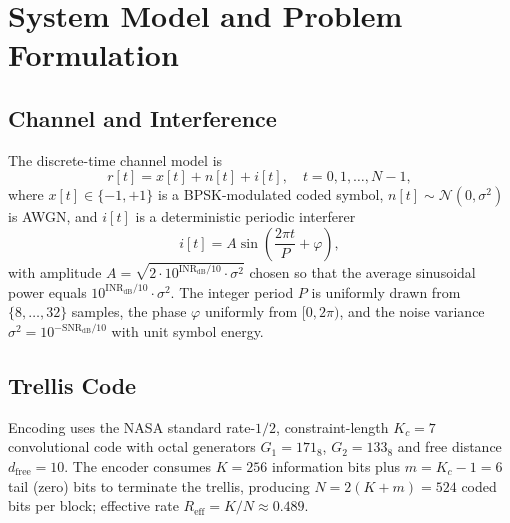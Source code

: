 \documentclass[conference]{IEEEtran}
\newcommand{\dfree}{d_{\mathrm{free}}}
\begin{document}
\section{System Model and Problem Formulation}

\subsection{Channel and Interference}
The discrete-time channel model is
\begin{equation}
  r[t] = x[t] + n[t] + i[t], \quad t = 0, 1, \ldots, N-1,
  \label{eq:channel}
\end{equation}
where $x[t] \in \{-1,+1\}$ is a BPSK-modulated coded symbol,
$n[t] \sim \mathcal{N}(0, \sigma^2)$ is AWGN, and $i[t]$ is a
deterministic periodic interferer
\begin{equation}
  i[t] = A \sin\!\left(\frac{2\pi t}{P} + \varphi\right),
  \label{eq:interference}
\end{equation}
with amplitude $A = \sqrt{2 \cdot 10^{\mathrm{INR}_{\mathrm{dB}}/10} \cdot \sigma^2}$
chosen so that the average sinusoidal power equals
$10^{\mathrm{INR}_{\mathrm{dB}}/10} \cdot \sigma^2$.
The integer period $P$ is uniformly drawn from $\{8,\ldots,32\}$ samples,
the phase $\varphi$ uniformly from $[0,2\pi)$, and the noise variance
$\sigma^2 = 10^{-\mathrm{SNR}_{\mathrm{dB}}/10}$ with unit symbol energy.

\subsection{Trellis Code}
Encoding uses the NASA standard rate-$1/2$, constraint-length $K_c=7$
convolutional code with octal generators $G_1=171_8$, $G_2=133_8$ and
free distance $\dfree=10$.  The encoder consumes $K=256$ information bits
plus $m=K_c-1=6$ tail (zero) bits to terminate the trellis, producing
$N=2(K{+}m)=524$ coded bits per block; effective rate
$R_{\mathrm{eff}}=K/N\approx 0.489$.
\end{document}
